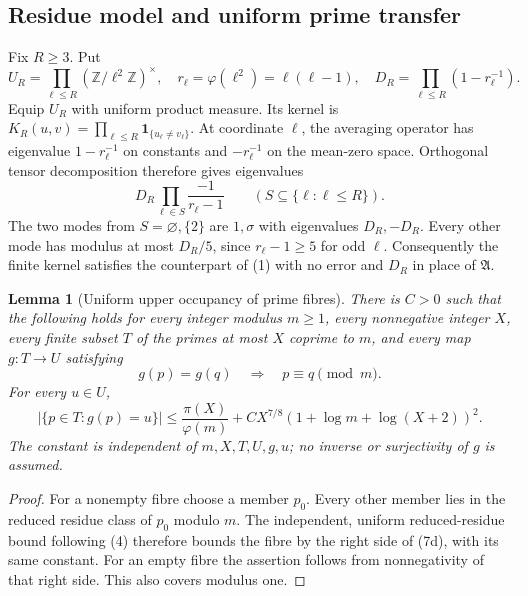 \documentclass[11pt]{article}
\newtheorem{lemma}{Lemma}
\newcommand{\Aconst}{\mathfrak A}
\begin{document}
\subsection{Residue model and uniform prime transfer}

Fix \(R\ge3\). Put
\[
 U_R=\prod_{\ell\le R}(\mathbb Z/\ell^2\mathbb Z)^\times,\quad
 r_\ell=\varphi(\ell^2)=\ell(\ell-1),\quad
 D_R=\prod_{\ell\le R}(1-r_\ell^{-1}).
\]
Equip \(U_R\) with uniform product measure. Its kernel is
\(K_R(u,v)=\prod_{\ell\le R}\mathbf1_{\{u_\ell\ne v_\ell\}}\).
At coordinate \(\ell\), the averaging operator has eigenvalue
\(1-r_\ell^{-1}\) on constants and \(-r_\ell^{-1}\) on the
mean-zero space. Orthogonal tensor decomposition therefore gives eigenvalues
\[
 D_R\prod_{\ell\in S}\frac{-1}{r_\ell-1}
       \qquad (S\subseteq\{\ell:\ell\le R\}).        \tag{7}
\]
The two modes from \(S=\varnothing,\{2\}\) are \(1,\sigma\)
with eigenvalues \(D_R,-D_R\).
Every other mode has modulus at most \(D_R/5\), since
\(r_\ell-1\ge5\) for odd \(\ell\). Consequently the finite kernel satisfies
the counterpart of (1) with no error and \(D_R\) in place of \(\Aconst\).

\begin{lemma}[Uniform upper occupancy of prime fibres]\label{lem:prime-fibres}
There is \(C>0\) such that the following holds for every integer modulus
\(m\ge1\), every nonnegative integer \(X\), every finite subset \(T\) of the primes
at most \(X\) coprime to \(m\), and every map \(g:T\to U\) satisfying
\[
 g(p)=g(q)\quad\Longrightarrow\quad p\equiv q\pmod m.
\]
For every \(u\in U\),
\[
 |\{p\in T:g(p)=u\}|\le\frac{\pi(X)}{\varphi(m)}
 +C X^{7/8}(1+\log m+\log(X+2))^2.                 \tag{7d}
\]
The constant is independent of \(m,X,T,U,g,u\); no inverse or
surjectivity of \(g\) is assumed.
\end{lemma}
\begin{proof}
For a nonempty fibre choose a member \(p_0\). Every other member
lies in the reduced residue class of \(p_0\) modulo \(m\).
The independent, uniform reduced-residue bound following (4) therefore
bounds the fibre by the right side of (7d), with its same constant.
For an empty fibre the assertion follows from nonnegativity of that
right side. This also covers modulus one.
\end{proof}
\end{document}
